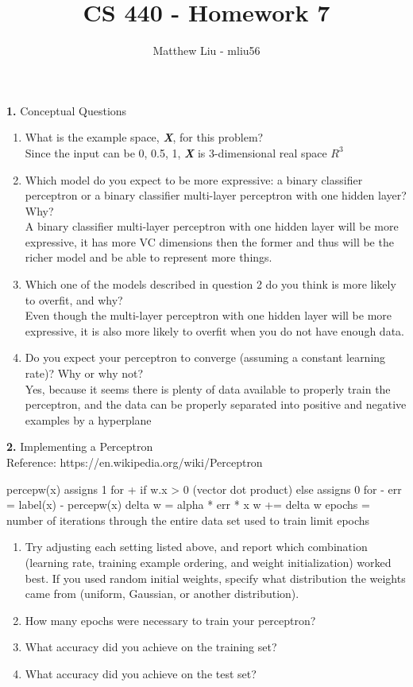 \documentclass[titlepage]{article}
\title{CS 440 - Homework 7}
\author{Matthew Liu - mliu56}
\date{}
\begin{document}
\maketitle{}

\noindent \textbf{1. } Conceptual Questions \\

\begin{enumerate}
	\item What is the example space, \textbf{\textit{X}}, for this problem? \\
	Since the input can be {0, 0.5, 1}, \textbf{\textit{X}} is 3-dimensional real space $R^3$
	\item Which model do you expect to be more expressive: a binary classifier perceptron or a binary classifier multi-layer perceptron with one hidden layer? Why? \\
	A binary classifier multi-layer perceptron with one hidden layer will be more expressive, it has more VC dimensions then the former and thus will be the richer model and be able to represent more things.
	\item Which one of the models described in question 2 do you think is more likely to overfit, and why? \\
	Even though the multi-layer perceptron with one hidden layer will be more expressive, it is also more likely to overfit when you do not have enough data.
	\item Do you expect your perceptron to converge (assuming a constant learning rate)? Why or why not? \\
	Yes, because it seems there is plenty of data available to properly train the perceptron, and the data can be properly separated into positive and negative examples by a hyperplane
\end{enumerate}

\pagebreak

\noindent \textbf{2. } Implementing a Perceptron \\

Reference: https://en.wikipedia.org/wiki/Perceptron

percepw(x) assigns 1 for + if w.x > 0 (vector dot product)
else assigns 0 for -
err = label(x) - percepw(x)
delta w = alpha * err * x
w += delta w
epochs = number of iterations through the entire data set used to train
limit epochs

\begin{enumerate}
	\item Try adjusting each setting listed above, and report which combination (learning rate, training example ordering, and weight initialization) worked best. If you used random initial weights, specify what distribution the weights came from (uniform, Gaussian, or another distribution).
	\item How many epochs were necessary to train your perceptron?
	\item What accuracy did you achieve on the training set?
	\item What accuracy did you achieve on the test set?	
\end{enumerate}
\end{document}
